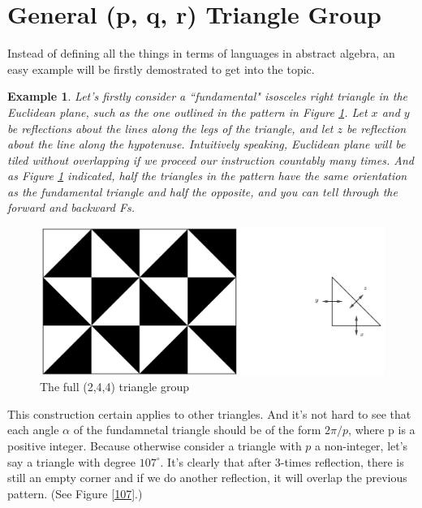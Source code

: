 \documentclass{article}
\newtheorem{Ex}{Example}[section]
\begin{document}
\section{General (p, q, r) Triangle Group}
Instead of defining all the things in terms of languages in abstract algebra, an easy example will be firstly demostrated to get into the topic.
\begin{Ex}
    Let's firstly consider a ``fundamental" isosceles right triangle in the Euclidean plane, such as the one outlined in the pattern in Figure \ref{2-4-4}. Let $x$ and $y$ be reflections about the lines along the legs of the triangle, and let $z$ be reflection about the line along the hypotenuse.
    Intuitively speaking, Euclidean plane will be tiled without overlapping if we proceed our instruction countably many times. And as Figure \ref {2-4-4} indicated, half the triangles in the pattern have the same orientation as the fundamental triangle and half the opposite, and you can tell through the forward and backward Fs.
\end{Ex}
\begin{figure}[ht]
    \includegraphics[width = 0.5\linewidth]{"2-4-4"}
    \centering
    \caption{The full (2,4,4) triangle group}
    \label{2-4-4}
\end{figure}
This construction certain applies to other triangles.
And it's not hard to see that each angle $\alpha$ of the
fundamnetal triangle should be of the form $2\pi/p$,
where p is a positive integer. Because otherwise consider
a triangle with $p$ a non-integer, let's say a triangle with
degree $107^{\circ}$. It's clearly that after 3-times reflection,
there is still an empty corner and if we do another reflection,
it will overlap the previous pattern. (See Figure \ref{107}.)
\end{document}
